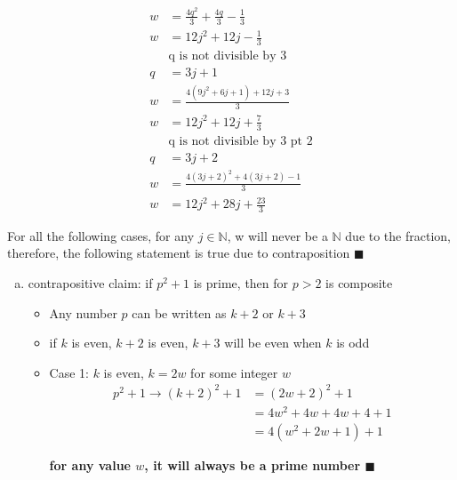 \documentclass{article}
\begin{document}
\begin{itemize}
\begin{enumerate}[(k)]
\begin{itemize}
\begin{align*}
                    w &= \frac{4q^2}{3} + \frac{4q}{3} - \frac{1}{3}\\
                    w&= 12j^2 + 12j - \frac{1}{3}\\
                    &\text{q is not divisible by 3}\\
                    q &= 3j + 1\\
                    w&= \frac{4(9j^2 + 6j + 1) + 12j + 3}{3}\\
                    w&= 12j^2 + 12j + \frac{7}{3}\\
                    &\text{q is not divisible by 3 pt 2}\\
                    q &= 3j + 2\\
                    w&= \frac{4(3j+2)^2 + 4(3j+2) - 1}{3}\\
                    w &= 12j^2 + 28j + \frac{23}{3}
                \end{align*}
                \begin{center}
                    For all the following cases, for any $j \in \mathbb{N}$, w will never be a $\mathbb{N}$ due to the fraction, therefore, the following statement is true due to contraposition $\blacksquare$
                \end{center}
            \end{itemize}
        \end{enumerate}
        \begin{enumerate}[(l)]
            \item contrapositive claim: if $p^2+1$ is prime, then for $p > 2$ is composite
            \begin{itemize}
                \item Any number $p$ can be written as $k+2$ or $k+3$
                \item if $k$ is even, $k + 2$ is even, $k+3$ will be even when $k$ is odd
                \item Case 1: $k$ is even, $k = 2w$ for some integer $w$
                \begin{align*}
                    p^2 + 1 \rightarrow (k+2)^2 + 1 &= (2w+2)^2 + 1\\
                    &=4w^2 + 4w + 4w + 4 + 1\\
                    &=4(w^2 + 2w + 1) + 1
                \end{align*}
                \begin{center}
                    \textbf{for any value $w$, it will always be a prime number $\blacksquare$}

\end{center}
\end{itemize}
\end{enumerate}
\end{itemize}
\end{document}
